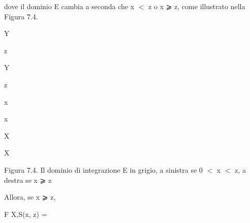 \documentclass[a4paper,portrait,12pt]{article}
\begin{document}
\begin{flushleft}
dove il dominio E cambia a seconda che x $<$ z o x ⩾ z, come illustrato nella Figura 7.4.
\end{flushleft}


\begin{flushleft}
Y
\end{flushleft}


\begin{flushleft}
z
\end{flushleft}





\begin{flushleft}
Y
\end{flushleft}


\begin{flushleft}
z
\end{flushleft}





\begin{flushleft}
x
\end{flushleft}





\begin{flushleft}
x
\end{flushleft}





\begin{flushleft}
X
\end{flushleft}





\begin{flushleft}
X
\end{flushleft}





\begin{flushleft}
Figura 7.4. Il dominio di integrazione E in grigio, a sinistra se 0 $<$ x $<$ z, a destra se x ⩾ z
\end{flushleft}





\begin{flushleft}
Allora, se x ⩾ z,
\end{flushleft}


\begin{flushleft}
F X,S(x, z) =
\end{flushleft}
\end{document}
